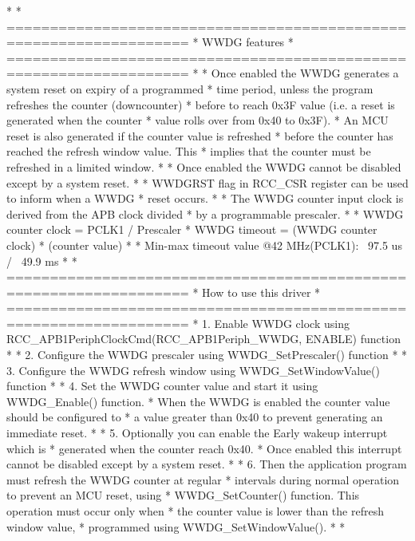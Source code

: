 \begin{DoxyVerb}*    
*          ===================================================================
*                                     WWDG features
*          ===================================================================
*                                        
*          Once enabled the WWDG generates a system reset on expiry of a programmed
*          time period, unless the program refreshes the counter (downcounter) 
*          before to reach 0x3F value (i.e. a reset is generated when the counter
*          value rolls over from 0x40 to 0x3F). 
*          An MCU reset is also generated if the counter value is refreshed
*          before the counter has reached the refresh window value. This 
*          implies that the counter must be refreshed in a limited window.
*            
*          Once enabled the WWDG cannot be disabled except by a system reset.                          
*          
*          WWDGRST flag in RCC_CSR register can be used to inform when a WWDG
*          reset occurs.
*            
*          The WWDG counter input clock is derived from the APB clock divided 
*          by a programmable prescaler.
*              
*          WWDG counter clock = PCLK1 / Prescaler
*          WWDG timeout = (WWDG counter clock) * (counter value)
*                      
*          Min-max timeout value @42 MHz(PCLK1): ~97.5 us / ~49.9 ms
*                            
*          ===================================================================
*                                 How to use this driver
*          =================================================================== 
*          1. Enable WWDG clock using RCC_APB1PeriphClockCmd(RCC_APB1Periph_WWDG, ENABLE) function
*            
*          2. Configure the WWDG prescaler using WWDG_SetPrescaler() function
*                           
*          3. Configure the WWDG refresh window using WWDG_SetWindowValue() function
*            
*          4. Set the WWDG counter value and start it using WWDG_Enable() function.
*             When the WWDG is enabled the counter value should be configured to 
*             a value greater than 0x40 to prevent generating an immediate reset.     
*            
*          5. Optionally you can enable the Early wakeup interrupt which is 
*             generated when the counter reach 0x40.
*             Once enabled this interrupt cannot be disabled except by a system reset.
*                 
*          6. Then the application program must refresh the WWDG counter at regular
*             intervals during normal operation to prevent an MCU reset, using
*             WWDG_SetCounter() function. This operation must occur only when
*             the counter value is lower than the refresh window value, 
*             programmed using WWDG_SetWindowValue().         
*
*  \end{DoxyVerb}


